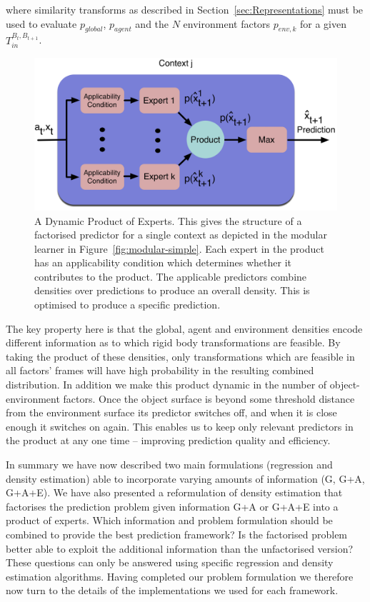 \noindent where similarity transforms as described in Section~\ref{sec:Representations} must be used to evaluate $p_{global}$, $p_{agent}$ and the $N$ environment factors $p_{env,k}$ for a given ${T}_{in}^{B_{t}, B_{t+1}}$.
\begin{figure}[t]
\centerline{\includegraphics[width=\columnwidth]{product-predictor}}
\caption[Factored Prediction]{ A Dynamic Product of Experts. This gives the structure of a factorised predictor for a single context as depicted in the modular learner in Figure~\ref{fig:modular-simple}. Each expert in the product has an applicability condition which determines whether it contributes to the product. The applicable predictors combine densities over predictions to produce an overall density. This is optimised to produce a specific prediction.}
\label{fig:modular}
\end{figure}

The key property here is that the global, agent and environment densities encode different information as to which rigid body transformations are feasible. By taking the product of these densities, only transformations which are feasible in all factors' frames will have high probability in the resulting combined distribution. In addition we make this product dynamic in the number of object-environment factors. Once the object surface is beyond some threshold distance from the environment surface its predictor switches off, and when it is close enough it switches on again. This enables us to keep only relevant predictors in the product at any one time -- improving prediction quality and efficiency. 

In summary we have now described two main formulations (regression and density estimation) able to incorporate varying amounts of information (G, G+A, G+A+E). We have also presented a reformulation of density estimation that factorises the prediction problem given information G+A or G+A+E into a product of experts. Which information and problem formulation should be combined to provide the best prediction framework?
Is the factorised problem better able to exploit the additional
information than the unfactorised version? These questions can only be
answered using specific regression and density estimation
algorithms. Having completed our problem formulation we therefore now
turn to the details of the implementations we used for each framework.

